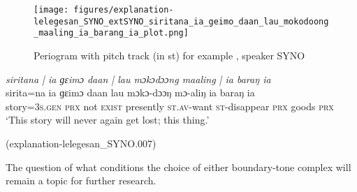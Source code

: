 \begin{figure}
	\texttt{[image: figures/explanation-lelegesan\_SYNO\_extSYNO\_siritana\_ia\_geimo\_daan\_lau\_mokodoong\_maaling\_ia\_barang\_ia\_plot.png]}
	\caption{Periogram with pitch track (in st) for example , speaker SYNO}
	\label{pitch:siritana ia geimo daan lau mokodoong maaling ia barang ia2}
\end{figure}


\newpage
\ea
\label{ex:siritana ia geimo daan lau mokodoong maaling ia barang ia2}
\textit{siritana | ia ɡɛimɔ daan | lau mɔkɔdɔɔng maaling | ia baraŋ ia} \\
\gll sirita=na ia ɡɛimɔ daan lau mɔkɔ-dɔɔŋ mɔ-aliŋ ia baraŋ ia \\
story=3\textsc{s}.\textsc{gen} \textsc{prx} not \textsc{exist} presently \textsc{st.av}-want \textsc{st}-disappear \textsc{prx} goods \textsc{prx}\\
\glt ‘This story will never again get lost; this thing.’ \begin{flushright}(explanation-lelegesan\_SYNO.007)
	\end{flushright}
\z


The question of what conditions the choice of either boundary-tone complex  will remain a topic for further  research.

